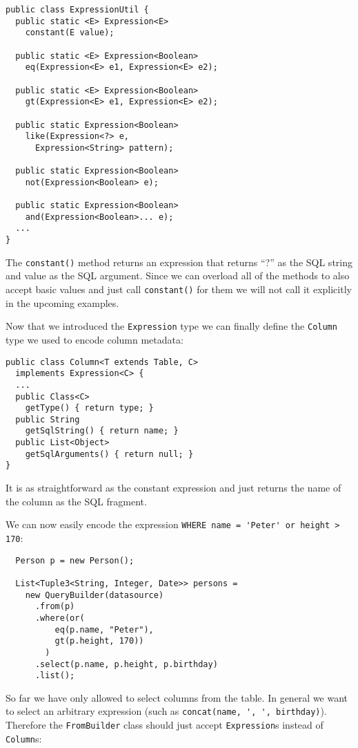 \documentclass{sig-alternate}
\begin{document}
\begin{verbatim}
public class ExpressionUtil {
  public static <E> Expression<E> 
    constant(E value);

  public static <E> Expression<Boolean> 
    eq(Expression<E> e1, Expression<E> e2);

  public static <E> Expression<Boolean> 
    gt(Expression<E> e1, Expression<E> e2);

  public static Expression<Boolean> 
    like(Expression<?> e,
      Expression<String> pattern);

  public static Expression<Boolean> 
    not(Expression<Boolean> e);

  public static Expression<Boolean> 
    and(Expression<Boolean>... e);
  ...
}
\end{verbatim}

The \verb!constant()! method returns an expression that returns ``?'' as the SQL string and value as the SQL argument. Since we can overload all of the methods to also accept basic values and just call \verb!constant()! for them we will not call it explicitly in the upcoming examples.

Now that we introduced the \verb!Expression! type we can finally define the \verb!Column! type we used to encode column metadata:

\begin{verbatim}
public class Column<T extends Table, C> 
  implements Expression<C> {
  ...
  public Class<C> 
    getType() { return type; }
  public String 
    getSqlString() { return name; }
  public List<Object> 
    getSqlArguments() { return null; }		
}
\end{verbatim}

It is as straightforward as the constant expression and just returns the name of the column as the SQL fragment.

We can now easily encode the expression \verb!WHERE name = 'Peter' or height > 170!:

\begin{verbatim}
  Person p = new Person();
		
  List<Tuple3<String, Integer, Date>> persons =
    new QueryBuilder(datasource)
      .from(p)
      .where(or(
          eq(p.name, "Peter"),
          gt(p.height, 170))
        )
      .select(p.name, p.height, p.birthday)
      .list();
\end{verbatim}


So far we have only allowed to select columns from the table. In general we want to select an arbitrary expression (such as \verb!concat(name, ', ', birthday)!). Therefore the \verb!FromBuilder! class should just accept \verb!Expression!s instead of \verb!Column!s:
\end{document}
